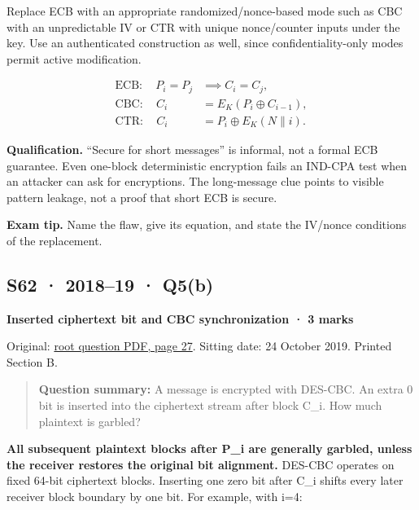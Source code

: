 \documentclass[11pt,a4paper]{article}
\begin{document}
Replace ECB with an appropriate randomized/\allowbreak{}nonce-based mode such as CBC with an unpredictable IV or CTR with unique nonce/\allowbreak{}counter inputs under the key. Use an authenticated construction as well,\allowbreak{} since confidentiality-only modes permit active modification.



\[
\begin{aligned}\mathrm{ECB}:\quad P_i=P_j&\implies C_i=C_j,\\\mathrm{CBC}:\quad C_i&=E_K(P_i\oplus C_{i-1}),\\\mathrm{CTR}:\quad C_i&=P_i\oplus E_K(N\parallel i).\end{aligned}
\]

\textbf{Qualification.} “Secure for short messages” is informal,\allowbreak{} not a formal ECB guarantee. Even one-block deterministic encryption fails an IND-CPA test when an attacker can ask for encryptions. The long-message clue points to visible pattern leakage,\allowbreak{} not a proof that short ECB is secure.



{\color{ForestGreen}\textbf{Exam tip.} Name the flaw,\allowbreak{} give its equation,\allowbreak{} and state the IV/\allowbreak{}nonce conditions of the replacement.}




\clearpage
\subsection{S62 · 2018–19 · Q5(b)}\label{s62}

\textbf{Inserted ciphertext bit and CBC synchronization · 3 marks}


Original: \href{../../CSE405-Security_Merged.pdf\#page=27}{root question PDF,\allowbreak{} page 27}. Sitting date: 24 October 2019. Printed Section B.



\begin{quote}\small

\textbf{Question summary:} A message is encrypted with DES-CBC. An extra 0 bit is inserted into the ciphertext stream after block C\_i. How much plaintext is garbled?



\end{quote}

\textbf{All subsequent plaintext blocks after P\_i are generally garbled,\allowbreak{} unless the receiver restores the original bit alignment.} DES-CBC operates on fixed 64-bit ciphertext blocks. Inserting one zero bit after C\_i shifts every later receiver block boundary by one bit. For example,\allowbreak{} with i=\allowbreak{}4:
\end{document}

